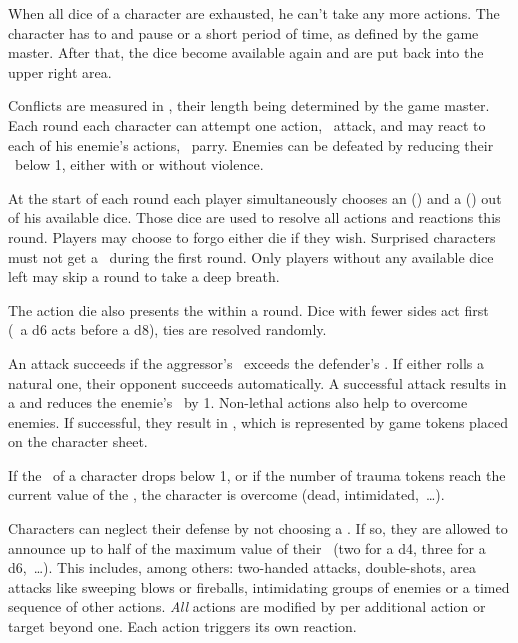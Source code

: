 {		When all dice of a character are exhausted, he can't take any more actions. The character has to  and pause or a short period of time, as defined by the game master. After that, the dice become available again and are put back into the upper right area.


		\noindent
		Conflicts are measured in , their length being determined by the game master. Each round each character can attempt one action, \eg\ attack, and may react to each of his enemie's actions, \eg\ parry. Enemies can be defeated by reducing their \HD\ below 1, either with or without violence.

		At the start of each round each player simultaneously chooses an  (\AD) and a  (\RD) out of his available dice. Those dice are used to resolve all actions and reactions this round. Players may choose to forgo either die if they wish. Surprised characters must not get a \AD\ during the first round. Only players without any available dice left may skip a round to take a deep breath.

		The action die also presents the  within a round. Dice with fewer sides act first (\eg\ a d6 acts before a d8), ties are resolved randomly.

		An attack succeeds if the aggressor's \AD\ exceeds the defender's \RD. If either rolls a natural one, their opponent succeeds automatically. A successful attack results in a  and reduces the enemie's \HD\ by 1. Non-lethal actions also help to overcome enemies. If successful, they result in , which is represented by game tokens placed on the character sheet.

		If the \HD~of a character drops below 1, or if the number of trauma tokens reach the current value of the \HD, the character is overcome (dead, intimidated,~\ldots).

		Characters can neglect their defense by not choosing a \RD. If so, they are allowed to announce  up to half of the maximum value of their \AD~(two for a d4, three for a d6,~\ldots). This includes, among others: two-handed attacks, double-shots, area attacks like sweeping blows or fireballs, intimidating groups of enemies or a timed sequence of other actions. \emph{All} actions are modified by  per additional action or target beyond one. Each action triggers its own reaction.

}
